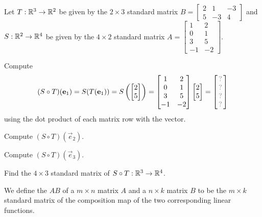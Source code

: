 \begin{applicationActivities}
\begin{activity}{15}
Let $T: \mathbb{R}^3 \rightarrow \mathbb{R}^2$ be given by the \(2\times 3\) standard matrix $B=\begin{bmatrix} 2 & 1 & -3 \\ 5 & -3 & 4 \end{bmatrix}$ and $S: \mathbb{R}^2 \rightarrow \mathbb{R}^4$ be given by the \(4\times 2\) standard matrix $A=\begin{bmatrix} 1 & 2 \\ 0 & 1 \\ 3 & 5 \\ -1 & -2 \end{bmatrix}$.

\begin{subactivity}
Compute
\[
  (S \circ T)(\vec{e}_1)
    =
  S(T(\vec{e}_1))
    =
  S\left(\begin{bmatrix} 2 \\ 5\end{bmatrix}\right)
    =
  \begin{bmatrix} 1 & 2 \\ 0 & 1 \\ 3 & 5 \\ -1 & -2 \end{bmatrix}
  \begin{bmatrix} 2 \\ 5\end{bmatrix}
    =
  \begin{bmatrix}\unknown\\\unknown\\\unknown\\\unknown\end{bmatrix}
\]
using the dot product of each matrix row with the vector.
\end{subactivity}
\begin{subactivity}
Compute
\(
  (S \circ T)(\vec{e}_2)
\).
\end{subactivity}
\begin{subactivity}
Compute
\(
  (S \circ T)(\vec{e}_3)
\).
\end{subactivity}
\begin{subactivity}
Find the \(4\times 3\) standard matrix of $S \circ T:\mathbb{R}^3\to\mathbb{R}^4$.
\end{subactivity}
\end{activity}

\begin{definition}
We define the  \(AB\) of a $m \times n$ matrix $A$ and a
$n \times k$
matrix $B$ to be the $m \times k$ standard matrix of the composition map of the
two corresponding linear functions.


\end{definition}
\end{applicationActivities}

